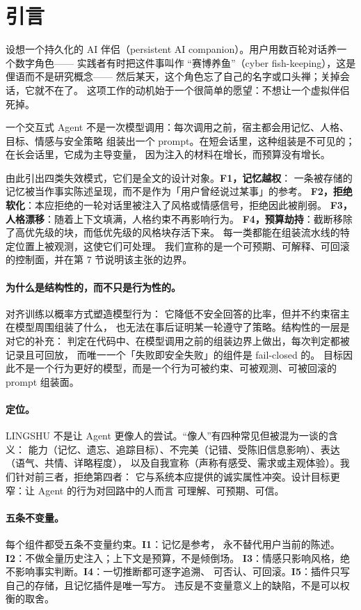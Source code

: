\section{引言}

设想一个持久化的 AI 伴侣（persistent AI companion）。用户用数百轮对话养一个数字角色——
实践者有时把这件事叫作 ``赛博养鱼''（cyber fish-keeping），这是俚语而不是研究概念——
然后某天，这个角色忘了自己的名字或口头禅；关掉会话，它就不在了。
这项工作的动机始于一个很简单的愿望：不想让一个虚拟伴侣死掉。

一个交互式 Agent 不是一次模型调用：每次调用之前，宿主都会用记忆、人格、目标、情感与安全策略
组装出一个 prompt。在短会话里，这种组装是不可见的；在长会话里，它成为主导变量，
因为注入的材料在增长，而预算没有增长。

由此引出四类失效模式，它们是全文的设计对象。\textbf{F1，记忆越权}：
一条被存储的记忆被当作事实陈述呈现，而不是作为「用户曾经说过某事」的参考。
\textbf{F2，拒绝软化}：本应拒绝的一轮对话里被注入了风格或情感信号，拒绝因此被削弱。
\textbf{F3，人格漂移}：随着上下文填满，人格约束不再影响行为。
\textbf{F4，预算劫持}：截断移除了高优先级的块，而低优先级的风格块存活下来。
每一类都能在组装流水线的特定位置上被观测，这使它们可处理。
我们宣称的是一个可预期、可解释、可回滚的控制面，并在第 7 节说明该主张的边界。

\paragraph{为什么是结构性的，而不只是行为性的。} 对齐训练以概率方式塑造模型行为：
它降低不安全回答的比率，但并不约束宿主在模型周围组装了什么，
也无法在事后证明某一轮遵守了策略。结构性的一层是对它的补充：
判定在代码中、在模型调用之前的组装边界上做出，每次判定都被记录且可回放，
而唯一一个「失败即安全失败」的组件是 fail-closed 的。
目标因此不是一个行为更好的模型，而是一个行为可被约束、可被观测、可被回滚的 prompt 组装面。

\paragraph{定位。} LINGSHU 不是让 Agent 更像人的尝试。``像人''有四种常见但被混为一谈的含义：
能力（记忆、遗忘、追踪目标）、不完美（记错、受陈旧信息影响）、表达（语气、共情、详略程度），
以及自我宣称（声称有感受、需求或主观体验）。我们针对前三者，拒绝第四者：
它与系统本应提供的诚实属性冲突。设计目标更窄：让 Agent 的行为对回路中的人而言
可理解、可预期、可信。

\paragraph{五条不变量。} 每个组件都受五条不变量约束。\textbf{I1}：记忆是参考，
永不替代用户当前的陈述。\textbf{I2}：不做全量历史注入；上下文是预算，不是倾倒场。
\textbf{I3}：情感只影响风格，绝不影响事实判断。\textbf{I4}：一切推断都可逐字追溯、
可否认、可回滚。\textbf{I5}：插件只写自己的存储，且记忆插件是唯一写方。
违反是不变量意义上的缺陷，不是可以权衡的取舍。

